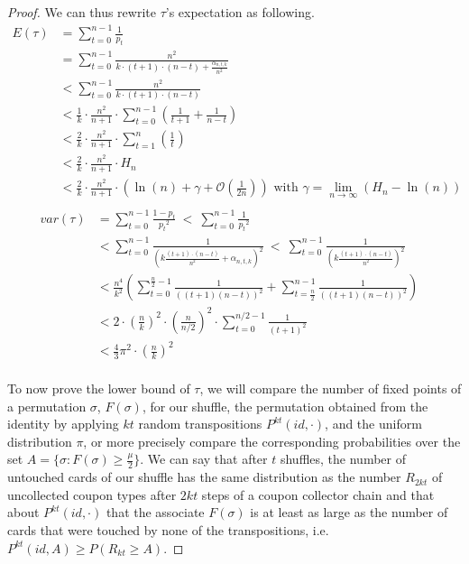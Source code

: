\documentclass[conference]{IEEEtran}
\begin{document}
\begin{proof}
We can thus rewrite $\tau$'s expectation as following.
\begin{align*}
 E(\tau) &= \sum_{t=0}^{n-1} \frac{1}{p_{t}} &\\
 &= \sum_{t=0}^{n-1} \frac{n^2}{k \cdot (t+1)\cdot(n-t) + \frac{\alpha_{n,t,k}}{n^2}}&\\
 &< \sum_{t=0}^{n-1} \frac{n^2}{k \cdot (t+1)\cdot(n-t)}  &\\
 &< \frac{1}{k} \cdot \frac{n^2}{n+1} \cdot  \sum_{t=0}^{n-1} \left ( \frac{1}{t+1} + \frac{1}{n-t} \right ) &\\
 &< \frac{2}{k} \cdot \frac{n^2}{n+1} \cdot \sum_{t=1}^{n} \left ( \frac{1}{t} \right ) &\\
 &< \frac{2}{k} \cdot \frac{n^2}{n+1} \cdot H_n &\\
 &< \frac{2}{k} \cdot \frac{n^2}{n+1} \cdot \left( \ln(n) + \gamma +\mathcal{O}(\frac{1}{2n}) \right ) \text{ with } \gamma = \lim_{n \to \infty} \left ( H_n - \ln(n) \right ) & \\
 \end{align*}
 \begin{align*}
 var(\tau) &= \sum_{t=0}^{n-1}\frac{1-p_t}{{p_t}^2}\ <\  \sum_{t=0}^{n-1}\frac{1}{{p_t}^2} &\\
 &< \sum_{t=0}^{n-1}\frac{1}{\left ( k \frac{(t+1)\cdot(n-t)}{n^2} + \alpha_{n,t,k}\right )^2}\ <\ \sum_{t=0}^{n-1} \frac{1 }{\left ( k \frac{(t+1)\cdot(n-t)}{n^2} \right )^2} &\\
 &< \frac{n^4}{k^2} \left ( \sum_{t=0}^{\frac{n}{2}-1} \frac{1}{\left ( (t+1)(n-t)\right )^2}  + \sum_{t=\frac{n}{2}}^{n-1} \frac{1}{\left ( (t+1)(n-t)\right )^2} \right ) &\\
 &< 2 \cdot \left (\frac{n}{k} \right )^2 \cdot \left (\frac{n}{n/2} \right )^2 \cdot \sum_{t=0}^{n/2-1} \frac{1}{(t+1)^2} &\\
 &< \frac{4}{3} \pi^2 \cdot \left (\frac{n}{k} \right )^2 
\end{align*}
\\

To now prove the lower bound of $\tau$, we will compare the number of fixed points of a permutation $\sigma$, $F(\sigma)$, for our shuffle, the permutation
obtained from the identity by applying $kt$ random transpositions $ P^{kt}(id, \cdot)$, and the uniform distribution $\pi$, or more precisely compare the corresponding probabilities over the set $A=\{\sigma : F(\sigma) \geq \frac{\mu}{2} \}$.
We can say that after $t$ shuffles, the number of untouched cards of our shuffle has the same distribution as the number $R_{2kt}$ of uncollected coupon types after $2kt$ steps of a coupon collector chain
and that about $ P^{kt}(id, \cdot)$ that the associate $F(\sigma)$ is at least as large as the number of cards that were touched by none of the transpositions, i.e. $P^{kt}(id,A) \geq P(R_{kt}\geq A) $.


\end{proof}
\end{document}
